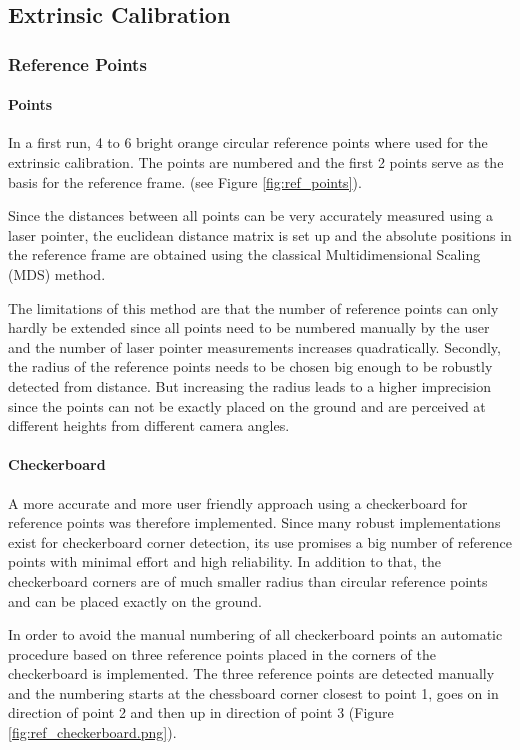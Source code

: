 \subsection{Extrinsic Calibration}
\label{sec:extrinsic}
\subsubsection{Reference Points}

\paragraph{Points} 
In a first run, 4 to 6 bright orange circular reference points where used for the extrinsic calibration. The points are numbered and the first 2 points serve as the basis for the reference frame. (see Figure \ref{fig:ref_points}).

Since the distances between all points can be very accurately measured using a laser pointer, the euclidean distance matrix is set up and the absolute positions in the reference frame are obtained using the classical Multidimensional Scaling (MDS) method. \cite{Wickelmaier2003}

The limitations of this method are that the number of reference points can only hardly be extended since all points need to be numbered manually by the user and the number of laser pointer measurements increases quadratically.
Secondly, the radius of the reference points needs to be chosen big enough to be robustly detected from distance. But increasing the radius leads to a higher imprecision since the points can not be exactly placed on the ground and are perceived at different heights from different camera angles.

\paragraph{Checkerboard}
A more accurate and more user friendly approach using a checkerboard for reference points was therefore implemented. 
Since many robust implementations exist for checkerboard corner detection, its use promises a big number of reference points with minimal effort and high reliability. 
In addition to that, the checkerboard corners are of much smaller radius than circular reference points and can be placed exactly on the ground.

In order to avoid the manual numbering of all checkerboard points an automatic procedure based on three reference points placed in the corners of the checkerboard is implemented. 
The three reference points are detected manually and the numbering starts at the chessboard corner closest to point 1, goes on in direction of point 2 and then up in direction of point 3 (Figure \ref{fig:ref_checkerboard.png}).

